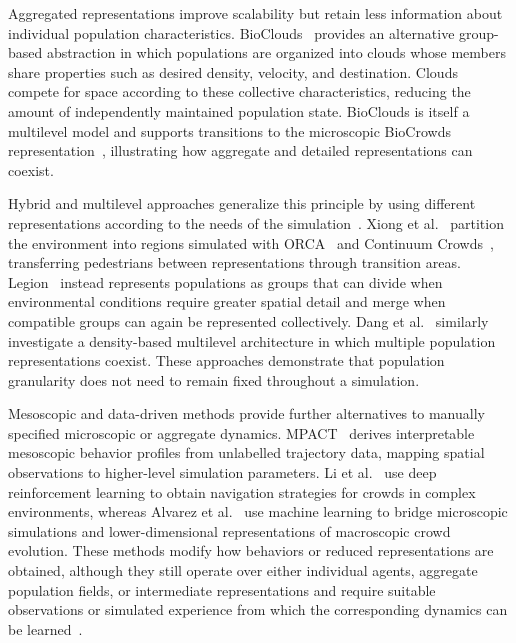 Aggregated representations improve scalability but retain less information about individual population characteristics. BioClouds~\cite{antonitsch2019bioclouds} provides an alternative group-based abstraction in which populations are organized into clouds whose members share properties such as desired density, velocity, and destination. Clouds compete for space according to these collective characteristics, reducing the amount of independently maintained population state. BioClouds is itself a multilevel model and supports transitions to the microscopic BioCrowds representation~\cite{de2012simulating}, illustrating how aggregate and detailed representations can coexist.

Hybrid and multilevel approaches generalize this principle by using different representations according to the needs of the simulation~\cite{ijaz2015hybridSurvey}. Xiong et al.~\cite{xiong2010hybrid} partition the environment into regions simulated with ORCA~\cite{van2011reciprocal} and Continuum Crowds~\cite{treuille2006continuum}, transferring pedestrians between representations through transition areas. Legion~\cite{legion} instead represents populations as groups that can divide when environmental conditions require greater spatial detail and merge when compatible groups can again be represented collectively. Dang et al.~\cite{dang2023multilevelCrowd} similarly investigate a density-based multilevel architecture in which multiple population representations coexist. These approaches demonstrate that population granularity does not need to remain fixed throughout a simulation.

Mesoscopic and data-driven methods provide further alternatives to manually specified microscopic or aggregate dynamics. MPACT~\cite{lemonari2025mpact} derives interpretable mesoscopic behavior profiles from unlabelled trajectory data, mapping spatial observations to higher-level simulation parameters. Li et al.~\cite{Li2025efficienteCrowdSim} use deep reinforcement learning to obtain navigation strategies for crowds in complex environments, whereas Alvarez et al.~\cite{alvarez2025quationfree} use machine learning to bridge microscopic simulations and lower-dimensional representations of macroscopic crowd evolution. These methods modify how behaviors or reduced representations are obtained, although they still operate over either individual agents, aggregate population fields, or intermediate representations and require suitable observations or simulated experience from which the corresponding dynamics can be learned~\cite{lemonari2025mpact,Li2025efficienteCrowdSim,alvarez2025quationfree}.


